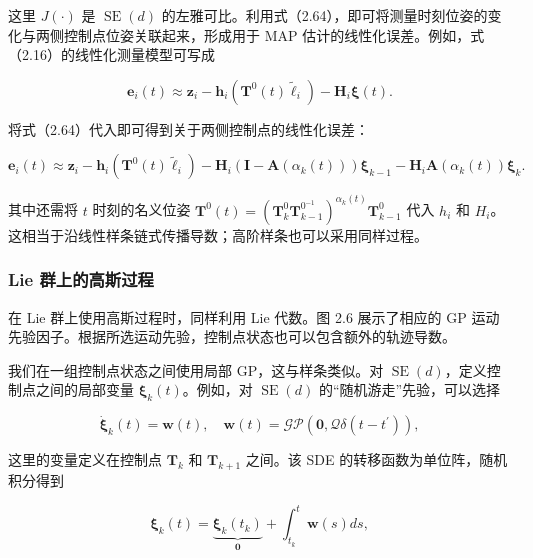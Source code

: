 这里 $J(\cdot)$ 是 $\operatorname{SE}(d)$ 的左雅可比。利用式（2.64），即可将测量时刻位姿的变化与两侧控制点位姿关联起来，形成用于 MAP 估计的线性化误差。例如，式（2.16）的线性化测量模型可写成

\begin{equation}
\boldsymbol {e} _ {i} (t) \approx \boldsymbol {z} _ {i} - \boldsymbol {h} _ {i} \left(\boldsymbol {T} ^ {0} (t) \tilde {\ell} _ {i}\right) - \boldsymbol {H} _ {i} \boldsymbol {\xi} (t).\tag{2.66}
\end{equation}

将式（2.64）代入即可得到关于两侧控制点的线性化误差：

\begin{equation}
\pmb {e} _ {i} (t) \approx \pmb {z} _ {i} - \pmb {h} _ {i} \left(\pmb {T} ^ {0} (t) \tilde {\pmb {\ell}} _ {i}\right) - \pmb {H} _ {i} \left(\pmb {I} - \pmb {A} (\alpha _ {k} (t))\right) \pmb {\xi} _ {k - 1} - \pmb {H} _ {i} \pmb {A} (\alpha _ {k} (t)) \pmb {\xi} _ {k}.\tag{2.67}
\end{equation}

其中还需将 $t$ 时刻的名义位姿 $\pmb T^0(t)=(\pmb T_k^0\pmb T_{k-1}^{0^{-1}})^{\alpha_k(t)}\pmb T_{k-1}^0$ 代入 $h_i$ 和 $H_i$。这相当于沿线性样条链式传播导数；高阶样条也可以采用同样过程。

\subsubsection{Lie 群上的高斯过程}

在 Lie 群上使用高斯过程时，同样利用 Lie 代数。图 2.6 展示了相应的 GP 运动先验因子。根据所选运动先验，控制点状态也可以包含额外的轨迹导数。

我们在一组控制点状态之间使用局部 GP，这与样条类似。对 $\operatorname{SE}(d)$，定义控制点之间的局部变量 $\pmb\xi_k(t)$。例如，对 $\operatorname{SE}(d)$ 的“随机游走”先验，可以选择

\begin{equation}
\dot {\pmb {\xi}} _ {k} (t) = \pmb {w} (t), \quad \pmb {w} (t) = \mathcal {GP} (\pmb {0}, \pmb {\mathcal {Q}} \delta (t - t ^ {\prime})),\tag{2.68}
\end{equation}

这里的变量定义在控制点 $\pmb T_k$ 和 $\pmb T_{k+1}$ 之间。该 SDE 的转移函数为单位阵，随机积分得到

\begin{equation}
\boldsymbol {\xi} _ {k} (t) = \underbrace {\boldsymbol {\xi} _ {k} (t _ {k})} _ {\mathbf {0}} + \int_ {t _ {k}} ^ {t} \boldsymbol {w} (s) d s,\tag{2.69}
\end{equation}

